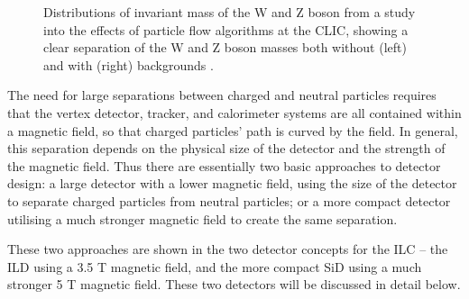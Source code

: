 \begin{figure}[!b]%
	\centering
    \qquad
    \caption{Distributions of invariant mass of the W and Z boson from a study into the effects of particle flow algorithms at the \acrlong{CLIC}, showing a clear separation of the W and Z boson masses both without (left) and with (right) backgrounds \cite{particle-flow-clic}.}%
    \label{figure:colliders/particle-flow}%
\end{figure}

The need for large separations between charged and neutral particles requires that the vertex detector, tracker, and calorimeter systems are all contained within a magnetic field, so that charged particles' path is curved by the field. In general, this separation depends on the physical size of the detector and the strength of the magnetic field. Thus there are essentially two basic approaches to detector design: a large detector with a lower magnetic field, using the size of the detector to separate charged particles from neutral particles; or a more compact detector utilising a much stronger magnetic field to create the same separation.

These two approaches are shown in the two detector concepts for the \acrshort{ILC} -- the \acrlong{ILD} using a 3.5 T magnetic field, and the more compact \acrlong{SiD} using a much stronger 5 T magnetic field. These two detectors will be discussed in detail below.

